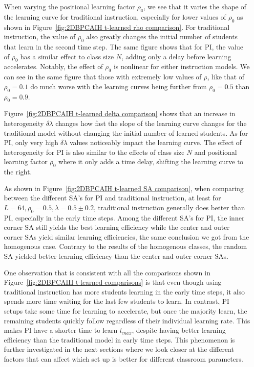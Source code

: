 When varying the positional learning factor $\rho_0$, we see that it varies the shape of the learning curve for traditional instruction, especially for lower values of $\rho_0$ as shown in Figure~\ref{fig:2DBPCAIH t-learned rho comparison}. 
For traditional instruction, the value of $\rho_0$ also greatly changes the initial number of students that learn in the second time step.
The same figure shows that for PI, the value of $\rho_0$ has a similar effect to class size $N$, adding only a delay before learning accelerates.
Notably, the effect of $\rho_0$ is nonlinear for either instruction models.
We can see in the same figure that those with extremely low values of $\rho$, like that of $\rho_0=0.1$ do much worse with the learning curves being further from $\rho_0=0.5$ than $\rho_0=0.9$.

Figure~\ref{fig:2DBPCAIH t-learned delta comparison} shows that an increase in heterogeneity $\delta\lambda$ changes how fast the slope of the learning curve changes for the traditional model without changing the initial number of learned students. 
As for PI, only very high $\delta\lambda$ values noticeably impact the learning curve.
The effect of heterogeneity for PI is also similar to the effects of class size $N$ and positional learning factor $\rho_0$ where it only adds a time delay, shifting the learning curve to the right.

As shown in Figure~\ref{fig:2DBPCAIH t-learned SA comparison}, when comparing between the different SA's for PI and traditional instruction, at least for $L=64, \rho_0=0.5, \lambda=0.5\pm0.2$, traditional instruction generally does better than PI, especially in the early time steps. 
Among the different SA's for PI, the inner corner SA still yields the best learning efficiency while the center and outer corner SAs yield similar learning efficiencies, the same conclusion we got from the homogenous case.
Contrary to the results of the homogenous classes, the random SA yielded better learning efficiency than the center and outer corner SAs.

One observation that is consistent with all the comparisons shown in Figure~\ref{fig:2DBPCAIH t-learned comparisons} is that even though using traditional instruction has more students learning in the early time steps, it also spends more time waiting for the last few students to learn. 
In contrast, PI setups take some time for learning to accelerate, but once the majority learn, the remaining students quickly follow regardless of their individual learning rate.
This makes PI have a shorter time to learn $t_{max}$, despite having better learning efficiency than the traditional model in early time steps.
This phenomenon is further investigated in the next sections where we look closer at the different factors that can affect which set up is better for different classroom parameters.

